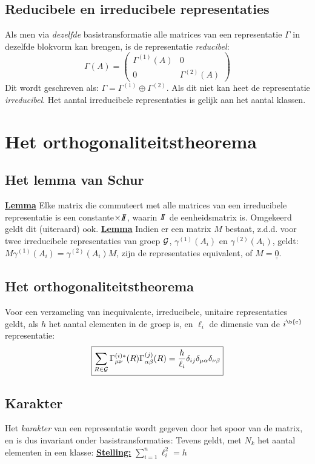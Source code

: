 \documentclass[twoside]{report}
\begin{document}
\subsection{Reducibele en irreducibele representaties}
Als men via {\it dezelfde} basistransformatie alle matrices van een representatie
$\Gamma$ in dezelfde blokvorm kan brengen, is de representatie {\it reducibel}:
\[
\Gamma(A)=\left(\begin{array}{cc}
\Gamma^{(1)}(A)&0\\ 0&\Gamma^{(2)}(A)
\end{array}\right)
\]
Dit wordt geschreven als: $\Gamma=\Gamma^{(1)}\oplus\Gamma^{(2)}$.
Als dit niet kan heet de representatie {\it irreducibel}.
\npar
Het aantal irreducibele representaties is gelijk aan het aantal klassen.

\section{Het orthogonaliteitstheorema}
\subsection{Het lemma van Schur}
\underline{\bf Lemma} Elke matrix die commuteert met alle matrices van een
irreducibele representatie is een constante$\times I\hspace{-0.8ex}I$, waarin $I\hspace{-0.8ex}I$ de
eenheidsmatrix is. Omgekeerd geldt dit (uiteraard) ook.
\npar
\underline{\bf Lemma} Indien er een matrix $M$ bestaat, z.d.d. voor twee
irreducibele representaties van groep ${\cal{G}}$, $\gamma^{(1)}(A_i)$ en $\gamma^{(2)}(A_i)$,
geldt: $M\gamma^{(1)}(A_i)=\gamma^{(2)}(A_i)M$, zijn de representaties
equivalent, of $M=\underline{\underline{0}}$.

\subsection{Het orthogonaliteitstheorema}
Voor een verzameling van inequivalente, irreducibele, unitaire representaties
geldt, als $h$ het aantal elementen in de groep is, en $\ell_i$ de dimensie
van de $i^{\b{\rm e}}$ representatie:
\[
\mbox{\fbox{$\displaystyle
\sum_{R\in{\cal{G}}}\Gamma^{(i)*}_{\mu\nu}(R)\Gamma^{(j)}_{\alpha\beta}(R)=
\frac{h}{\ell_i}\delta_{ij}\delta_{\mu\alpha}\delta_{\nu\beta}
$}}
\]

\subsection{Karakter}
Het {\it karakter} van een representatie wordt gegeven door het spoor van de
matrix, en is dus invariant onder basistransformaties:
\npar
Tevens geldt, met $N_k$ het aantal elementen in een klasse:
\npar
\underline{\bf Stelling:} $\displaystyle\sum_{i=1}^{n}\ell_{i}^{2}=h$
\end{document}
